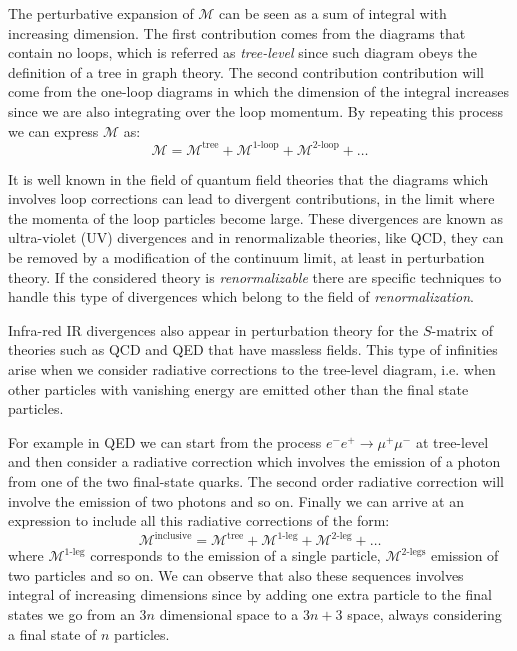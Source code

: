 \documentclass[../main/main.tex]{subfiles}
\begin{document}
The perturbative expansion of $\mathcal{M}$ can be seen as a sum of integral with increasing dimension. The first contribution comes 
from the diagrams that contain no loops, which is referred as \emph{tree-level} since such diagram obeys the definition of a tree in graph
theory. The second contribution contribution will come from the one-loop diagrams in which the dimension of the integral increases 
since we are also integrating over the loop momentum. By repeating this process we can express $\mathcal{M}$ as:
\begin{equation}
	\mathcal{M}=\mathcal{M}^{\text{tree}} + \mathcal{M}^{\text{1-loop}} + \mathcal{M}^{\text{2-loop}} + \dots
\end{equation}

It is well known in the field of quantum field theories that the diagrams which involves loop corrections can lead to divergent contributions, in the limit where the momenta of the loop particles become large. These divergences are known as ultra-violet (UV) divergences and in renormalizable theories, like QCD, they can be removed by a modification of the continuum limit, at least in perturbation theory.
If the considered theory is \emph{renormalizable} there are specific techniques to handle this type of divergences which belong to the 
field of \emph{renormalization}.

Infra-red IR divergences also appear in perturbation theory for the $S$-matrix of theories such as QCD and QED that have massless fields.
This type of infinities arise when we consider radiative corrections to the tree-level diagram, i.e. when other particles with vanishing energy are emitted other than the final state particles.

For example in QED we can start from the process $e^- e^+ \to \mu^+ \mu^-$ at tree-level and then consider a radiative correction which 
involves the emission of a photon from one of the two final-state quarks. The second order radiative correction will involve the emission of 
two photons and so on. Finally we can arrive at an expression to include all this radiative corrections of the form:
\begin{equation}
	\mathcal{M}^{\text{inclusive}} = \mathcal{M}^{\text{tree}} + \mathcal{M}^{\text{1-leg}} + \mathcal{M}^{\text{2-leg}} + \dots
\end{equation}
where $\mathcal{M}^{\text{1-leg}}$ corresponds to the emission of a single particle,  $\mathcal{M}^{\text{2-legs}}$ emission of two
particles and so on.
We can observe that also these sequences involves integral of increasing dimensions since by adding one extra particle to the final states 
we go from an $3n$ dimensional space to a $3n + 3$ space, always considering a final state of $n$ particles.
\end{document}
